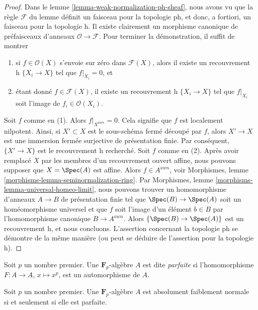 \begin{proof}
Dans le lemme \ref{lemma-weak-normalization-ph-sheaf},
nous avons vu que la règle $\mathcal{F}$ du lemme
définit un faisceau pour la topologie ph, et donc, a fortiori,
un faisceau pour la topologie h. Il existe clairement un morphisme canonique
de préfaisceaux d'anneaux $\mathcal{O} \to \mathcal{F}$.
Pour terminer la démonstration, il suffit de montrer
\begin{enumerate}
\item si $f \in \mathcal{O}(X)$ s'envoie sur zéro dans $\mathcal{F}(X)$,
alors il existe un recouvrement h $\{X_i \to X\}$ tel que $f|_{X_i} = 0$, et
\item étant donné $f \in \mathcal{F}(X)$, il existe un recouvrement h
$\{X_i \to X\}$ tel que $f|_{X_i}$ soit l'image de $f_i \in \mathcal{O}(X_i)$.
\end{enumerate}
Soit $f$ comme en (1). Alors $f|_{X^{awn}} = 0$. Cela signifie que $f$
est localement nilpotent. Ainsi, si $X' \subset X$ est le sous-schéma fermé
découpé par $f$, alors $X' \to X$ est une immersion fermée surjective de
présentation finie. Par conséquent, $\{X' \to X\}$ est le recouvrement h recherché.
Soit $f$ comme en (2). Après avoir remplacé $X$ par les membres d'un
recouvrement ouvert affine, nous pouvons supposer que $X = \Spec(A)$ est affine.
Alors $f \in A^{awn}$, voir
Morphismes, lemme \ref{morphisms-lemma-seminormalization-ring}.
Par Morphismes, lemme \ref{morphisms-lemma-universal-homeo-limit},
nous pouvons trouver un homomorphisme d'anneaux $A \to B$ de présentation finie
tel que $\Spec(B) \to \Spec(A)$ soit un homéomorphisme universel
et que $f$ soit l'image d'un élément $b \in B$ par
l'homomorphisme canonique $B \to A^{awn}$. Alors
$\{\Spec(B) \to \Spec(A)\}$ est un recouvrement h, et nous concluons.
L'assertion concernant la topologie ph se démontre de la même manière
(ou peut se déduire de l'assertion pour la topologie h).
\end{proof}

\noindent
Soit $p$ un nombre premier. Une $\mathbf{F}_p$-algèbre $A$ est
dite {\it parfaite} si l'homomorphisme $F : A \to A$, $x \mapsto x^p$,
est un automorphisme de $A$.

\begin{lemma}
\label{lemma-perfect-weankly-normal}
Soit $p$ un nombre premier. Une $\mathbf{F}_p$-algèbre $A$ est
absolument faiblement normale si et seulement si elle est parfaite.
\end{lemma}

